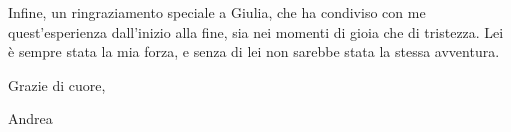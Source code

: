 \documentclass[pdfa,cucitura]{toptesi}
\begin{document}
Infine, un ringraziamento speciale a Giulia, che ha condiviso con me quest'esperienza dall'inizio alla fine, sia nei momenti di gioia che di tristezza.
Lei \`e sempre stata la mia forza, e senza di lei non sarebbe stata la stessa avventura.

\hfill Grazie di cuore,

\hfill Andrea



\indici

\mainmatter



















\end{document}
